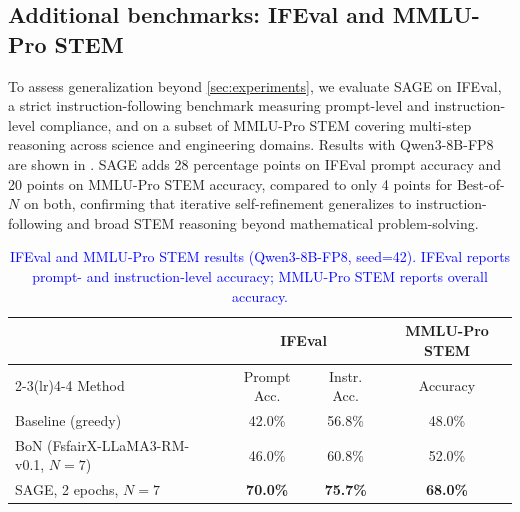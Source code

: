 \documentclass{article}
\theoremstyle{plain}
\theoremstyle{definition}
\theoremstyle{remark}
\newcommand{\method}{SAGE} %
\begin{document}
\subsection{Additional benchmarks: IFEval and MMLU-Pro STEM}

To assess generalization beyond \cref{sec:experiments}, we evaluate \method{} on IFEval, a strict instruction-following benchmark measuring prompt-level and instruction-level compliance, and on a subset of MMLU-Pro STEM covering multi-step reasoning across science and engineering domains. Results with Qwen3-8B-FP8 are shown in . \method{} adds 28 percentage points on IFEval prompt accuracy and 20 points on MMLU-Pro STEM accuracy, compared to only 4 points for Best-of-\(N\) on both, confirming that iterative self-refinement generalizes to instruction-following and broad STEM reasoning beyond mathematical problem-solving.

\begin{table}[h]
\caption{\textcolor{blue}{IFEval and MMLU-Pro STEM results (Qwen3-8B-FP8, seed=42). IFEval reports prompt- and instruction-level accuracy; MMLU-Pro STEM reports overall accuracy.}}
\label{tab:additional-benchmarks}
\vskip 0.1in
\centering
\begin{small}
\begin{sc}
\begin{tabular}{lccc}
\toprule
 & \multicolumn{2}{c}{IFEval} & MMLU-Pro STEM \\
\cmidrule(lr){2-3}\cmidrule(lr){4-4}
Method & Prompt Acc. & Instr. Acc. & Accuracy \\
\midrule
Baseline (greedy)           & 42.0\% & 56.8\% & 48.0\% \\
BoN (FsfairX-LLaMA3-RM-v0.1, $N=7$)        & 46.0\% & 60.8\% & 52.0\% \\
\method{}, 2 epochs, $N=7$  & \textbf{70.0\%} & \textbf{75.7\%} & \textbf{68.0\%} \\
\bottomrule
\end{tabular}
\end{sc}
\end{small}
\vskip -0.1in
\end{table}

\endgroup
\end{document}
